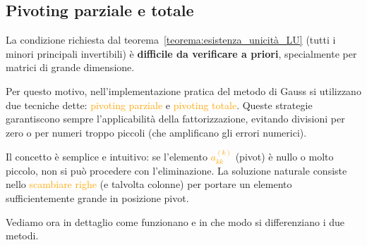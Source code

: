 \subsection{Pivoting parziale e totale}

La condizione richiesta dal teorema~\ref{teorema:esistenza_unicità_LU} (tutti i minori principali invertibili) è \textbf{difficile da verificare a priori}, specialmente per matrici di grande dimensione.

Per questo motivo, nell'implementazione pratica del metodo di Gauss si utilizzano due tecniche dette:
\textcolor{orange}{pivoting parziale} e \textcolor{orange}{pivoting totale}.  
Queste strategie garantiscono sempre l'applicabilità della fattorizzazione, evitando divisioni per zero o per numeri troppo piccoli (che amplificano gli errori numerici).

Il concetto è semplice e intuitivo: se l'elemento \textcolor{orange}{$a_{kk}^{(k)}$} (pivot) è nullo o molto piccolo, non si può procedere con l'eliminazione.  
La soluzione naturale consiste nello \textcolor{orange}{scambiare righe} (e talvolta colonne) per portare un elemento sufficientemente grande in posizione pivot.

Vediamo ora in dettaglio come funzionano e in che modo si differenziano i due metodi.

